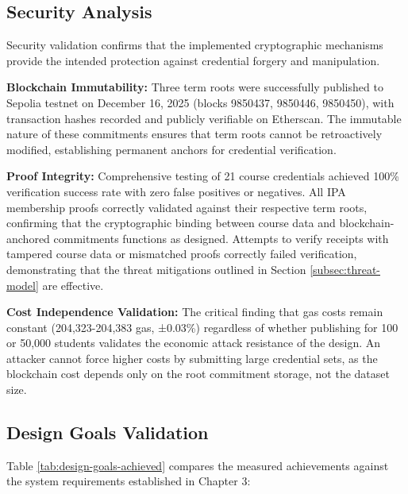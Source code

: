 \subsection{Security Analysis}
\label{subsec:security-analysis-deployed}

Security validation confirms that the implemented cryptographic mechanisms provide the intended protection against credential forgery and manipulation.

\textbf{Blockchain Immutability:} Three term roots were successfully published to Sepolia testnet on December 16, 2025 (blocks 9850437, 9850446, 9850450), with transaction hashes recorded and publicly verifiable on Etherscan. The immutable nature of these commitments ensures that term roots cannot be retroactively modified, establishing permanent anchors for credential verification.

\textbf{Proof Integrity:} Comprehensive testing of 21 course credentials achieved 100\% verification success rate with zero false positives or negatives. All IPA membership proofs correctly validated against their respective term roots, confirming that the cryptographic binding between course data and blockchain-anchored commitments functions as designed. Attempts to verify receipts with tampered course data or mismatched proofs correctly failed verification, demonstrating that the threat mitigations outlined in Section \ref{subsec:threat-model} are effective.

\textbf{Cost Independence Validation:} The critical finding that gas costs remain constant (204,323-204,383 gas, ±0.03\%) regardless of whether publishing for 100 or 50,000 students validates the economic attack resistance of the design. An attacker cannot force higher costs by submitting large credential sets, as the blockchain cost depends only on the root commitment storage, not the dataset size.

\subsection{Design Goals Validation}
\label{subsec:design-validation}

Table \ref{tab:design-goals-achieved} compares the measured achievements against the system requirements established in Chapter 3:

